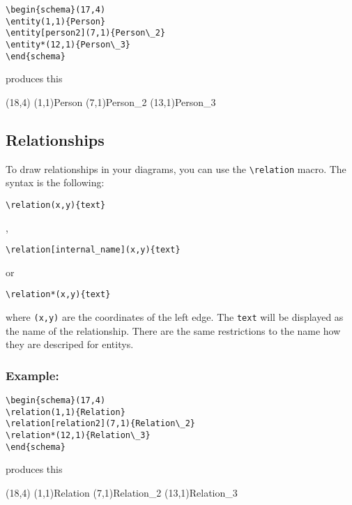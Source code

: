 \documentclass[a4paper,11pt]{article}
\begin{document}
\begin{verbatim}
\begin{schema}(17,4)
\entity(1,1){Person}
\entity[person2](7,1){Person\_2}
\entity*(12,1){Person\_3}
\end{schema}
\end{verbatim}

produces this

\begin{schema}(18,4)
\entity(1,1){Person}
\entity[person2](7,1){Person\_2}
\entity*(13,1){Person\_3}
\end{schema}

\subsection{Relationships}

To draw relationships in your diagrams, you can use the \verb|\relation| macro.
The syntax is the following:

\begin{verbatim}
\relation(x,y){text}
\end{verbatim}

,

\begin{verbatim}
\relation[internal_name](x,y){text}
\end{verbatim}

or

\begin{verbatim}
\relation*(x,y){text}
\end{verbatim}

where {\tt (x,y)} are the coordinates of the left edge. The {\tt text} will be displayed as 
the name of the relationship. There are the same restrictions to the name 
how they are descriped for entitys.

\subsubsection*{Example:}

\begin{verbatim}
\begin{schema}(17,4)
\relation(1,1){Relation}
\relation[relation2](7,1){Relation\_2}
\relation*(12,1){Relation\_3}
\end{schema}
\end{verbatim}

produces this

\begin{schema}(18,4)
\relation(1,1){Relation}
\relation[relation2](7,1){Relation\_2}
\relation*(13,1){Relation\_3}
\end{schema}
\end{document}
